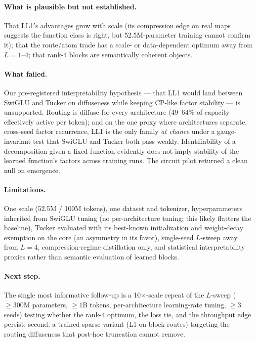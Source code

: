 \documentclass[11pt]{article}
\begin{document}
\paragraph{What is plausible but not established.}
That LL1's advantages grow with scale (its compression edge on real maps suggests the
function class is right, but 52.5M-parameter training cannot confirm it); that the
route/atom trade has a scale- or data-dependent optimum away from $L{=}1$--$4$; that
rank-4 blocks are semantically coherent objects.

\paragraph{What failed.}
Our pre-registered interpretability hypothesis --- that LL1 would land between SwiGLU
and Tucker on diffuseness while keeping CP-like factor stability --- is unsupported.
Routing is diffuse for every architecture (49--64\% of capacity effectively active
per token); and on the one proxy where architectures separate, cross-seed factor
recurrence, LL1 is the only family \emph{at chance} under a gauge-invariant test that
SwiGLU and Tucker both pass weakly. Identifiability of a decomposition given a fixed
function evidently does not imply stability of the learned function's factors across
training runs. The circuit pilot returned a clean null on emergence.

\paragraph{Limitations.}
One scale (52.5M / 100M tokens), one dataset and tokenizer, hyperparameters inherited
from SwiGLU tuning (no per-architecture tuning; this likely flatters the baseline),
Tucker evaluated with its best-known initialization and weight-decay exemption on the
core (an asymmetry in its favor), single-seed $L$-sweep away from $L{=}4$,
compression-regime distillation only, and statistical interpretability proxies rather
than semantic evaluation of learned blocks.

\paragraph{Next step.}
The single most informative follow-up is a 10$\times$-scale repeat of the $L$-sweep
(${\ge}300$M parameters, ${\ge}1$B tokens, per-architecture learning-rate tuning,
${\ge}3$ seeds) testing whether the rank-4 optimum, the loss tie, and the throughput
edge persist; second, a trained sparse variant (L1 on block routes) targeting the
routing diffuseness that post-hoc truncation cannot remove.
\end{document}
